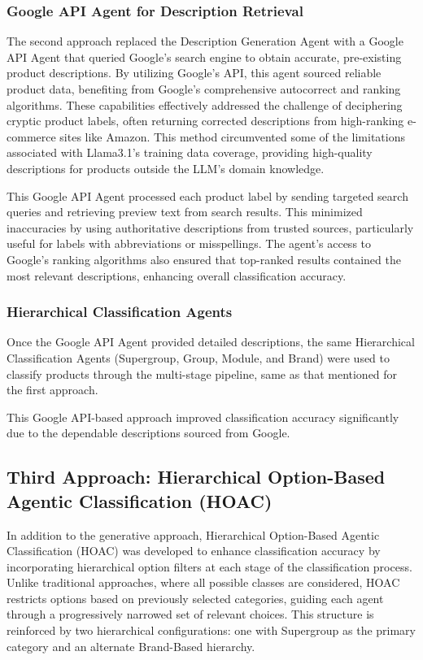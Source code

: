 \documentclass[9pt,a4paper,twoside]{rho-class/rho}
\begin{document}
\subsubsection{Google API Agent for Description Retrieval}
The second approach replaced the Description Generation Agent with a Google API Agent that queried Google’s search engine to obtain accurate, pre-existing product descriptions. By utilizing Google’s API, this agent sourced reliable product data, benefiting from Google’s comprehensive autocorrect and ranking algorithms. These capabilities effectively addressed the challenge of deciphering cryptic product labels, often returning corrected descriptions from high-ranking e-commerce sites like Amazon. This method circumvented some of the limitations associated with Llama3.1’s training data coverage, providing high-quality descriptions for products outside the LLM’s domain knowledge.

This Google API Agent processed each product label by sending targeted search queries and retrieving preview text from search results. This minimized inaccuracies by using authoritative descriptions from trusted sources, particularly useful for labels with abbreviations or misspellings. The agent’s access to Google’s ranking algorithms also ensured that top-ranked results contained the most relevant descriptions, enhancing overall classification accuracy.

\subsubsection{Hierarchical Classification Agents}
Once the Google API Agent provided detailed descriptions, the same Hierarchical Classification Agents (Supergroup, Group, Module, and Brand) were used to classify products through the multi-stage pipeline, same as that mentioned for the first approach.

This Google API-based approach improved classification accuracy significantly due to the dependable descriptions sourced from Google.

\subsection{Third Approach: Hierarchical Option-Based Agentic Classification (HOAC)}
In addition to the generative approach, Hierarchical Option-Based Agentic Classification (HOAC) was developed to enhance classification accuracy by incorporating hierarchical option filters at each stage of the classification process. Unlike traditional approaches, where all possible classes are considered, HOAC restricts options based on previously selected categories, guiding each agent through a progressively narrowed set of relevant choices. This structure is reinforced by two hierarchical configurations: one with Supergroup as the primary category and an alternate Brand-Based hierarchy.
\end{document}
